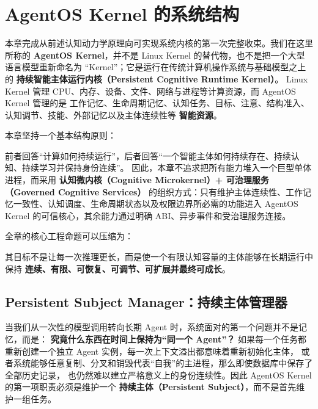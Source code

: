 \chapter{AgentOS Kernel 的系统结构}
\label{chap:agentos-kernel-architecture}

\begin{chapterlead}
本章完成从前述认知动力学原理向可实现系统内核的第一次完整收束。我们在这里所称的
\textbf{AgentOS Kernel}，并不是 Linux Kernel 的替代物，也不是把一个大型语言模型重新命名为
``Kernel''；它是运行在传统计算机操作系统与基础模型之上的
\textbf{持续智能主体运行内核（Persistent Cognitive Runtime Kernel）}。
Linux Kernel 管理 CPU、内存、设备、文件、网络与进程等计算资源，而 AgentOS Kernel 管理的是
工作记忆、生命周期记忆、认知任务、目标、注意、结构准入、认知调节、技能、外部记忆以及主体连续性等
\textbf{智能资源}。

本章坚持一个基本结构原则：
\begin{statementbox}
\centering
{}
\end{statementbox}
前者回答``计算如何持续运行''，后者回答``一个智能主体如何持续存在、持续认知、持续学习并保持身份连续''。
因此，本章不追求把所有能力堆入一个巨型单体进程，而采用
\textbf{认知微内核（Cognitive Microkernel）+ 可治理服务（Governed Cognitive Services）}
的组织方式：只有维护主体连续性、工作记忆一致性、认知调度、生命周期状态以及权限边界所必需的功能进入
AgentOS Kernel 的可信核心，其余能力通过明确 ABI、异步事件和受治理服务连接。

全章的核心工程命题可以压缩为：
\begin{statementbox}
\centering
{}
\end{statementbox}
其目标不是让每一次推理更长，而是使一个有限认知容量的主体能够在长期运行中保持
\textbf{连续、有限、可恢复、可调节、可扩展并最终可成长}。
\end{chapterlead}


\section{Persistent Subject Manager：持续主体管理器}

当我们从一次性的模型调用转向长期 Agent 时，系统面对的第一个问题并不是记忆，而是：
\textbf{究竟什么东西在时间上保持为``同一个 Agent''？}
如果每一个任务都重新创建一个独立 Agent 实例，每一次上下文溢出都意味着重新初始化主体，
或者系统能够任意复制、分叉和销毁代表``自我''的主进程，那么即使数据库中保存了全部历史记录，
也仍然难以建立严格意义上的身份连续性。因此 AgentOS Kernel 的第一项职责必须是维护一个
\textbf{持续主体（Persistent Subject）}，而不是首先维护一组任务。

